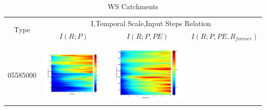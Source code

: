 \documentclass[11pt]{article}
\begin{document}
\begin{table}[H]
\caption{WS Catchments}
\resizebox{\textwidth}{!}
{
\centering
\begin{tabular}{cccc}
\toprule
\multirow{2}{*}{Type}&\multicolumn{3}{c}{I,Temporal Scale,Input Steps Relation}\\\cline{2-4}
&$I(R;P)$&$I(R;P,PE)$&$I(R;P,PE,R_{former})$\\\hline
\\
05585000
&\begin{minipage}{.3\textwidth}\includegraphics[width=\linewidth]{resultgraph/05585000p.png}\end{minipage}
&\begin{minipage}{.3\textwidth}\includegraphics[width=\linewidth]{resultgraph/05585000pep.png}\end{minipage}

\end{tabular}}
\end{table}
\end{document}
